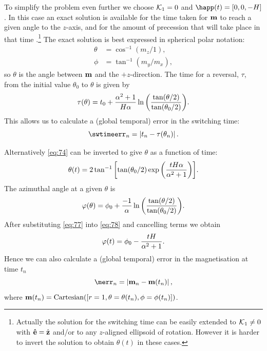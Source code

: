 To simplify the problem even further we choose $\mathcal{K}_1 = 0$ and $\happ(t) = [0, 0, -H]$.
In this case an exact solution is available for the time taken for $\boldsymbol{\mathrm{m}}$ to reach a given angle to the $z$-axis, and for the amount of precession that will take place in that time \cite{Mallinson2000}.\footnote{Actually the solution for the switching time can be easily extended to $\mathcal{K}_1 \neq 0$ with $\boldsymbol{\mathrm{\hat{e}}} = {\hat{\mathbf{z}}}$ and/or to any $z$-aligned ellipsoid of rotation.
However it is harder to invert the solution to obtain $\theta(t)$ in these cases.}
The exact solution is best expressed in spherical polar notation:
\begin{equation}
  \begin{aligned}
    \theta &= \cos^{-1}(m_z/1),\\
    \phi &= \tan^{-1}(m_y/m_x),
  \end{aligned}
\end{equation}
so $\theta$ is the angle between $\boldsymbol{\mathrm{m}}$ and the $+z$-direction.
The time for a reversal, $\tau$, from the initial value $\theta_0$ to $\theta$ is given by
\begin{equation}
  \tau(\theta) = t_0 + \frac{\alpha^2 +1}{H \alpha}
  \ln {\left(  \frac{\tan(\theta/2)}{\tan(\theta_0/2)}  \right)}.
  \label{eq:74}
\end{equation}
This allows us to calculate a (global temporal) error in the switching time:
\begin{equation}
  \swtimeerr_n = \abs{t_n - \tau(\theta_n)}.
  \label{eq:sw-time-error}
\end{equation}

Alternatively \cref{eq:74} can be inverted to give $\theta$ as a function of time:
\begin{equation}
  \theta(t) = 2 \tan^{-1} {\left[  \tan(\theta_0/2) \exp{\left( \frac{tH\alpha}{\alpha^2 + 1} \right)} \right]}.
\label{eq:77}
\end{equation}
The azimuthal angle at a given $\theta$ is \cite{Mallinson2000}
\begin{equation}
  \varphi(\theta) = \phi_0 +  \frac{-1}{\alpha} \ln {\left(  \frac{\tan(\theta/2)}{\tan(\theta_0/2)}  \right)}.
\label{eq:78}
\end{equation}
After substituting \cref{eq:77} into \cref{eq:78} and cancelling terms we obtain
\begin{equation}
  \varphi(t) = \phi_0 - \frac{tH}{\alpha^2 + 1}.
  \label{eq:79}
\end{equation}
Hence we can also calculate a (global temporal) error in the magnetisation at time $t_n$
\begin{equation}
  \merr_n = \abs{\mv_n - \mv(t_n)},
\label{eq:m-sphere-error}
\end{equation}
where $\boldsymbol{\mathrm{m}}(t_n) = \textrm{Cartesian}{\left( [r=1, \theta=\theta(t_n), \phi=\phi(t_n)] \right)}$.

